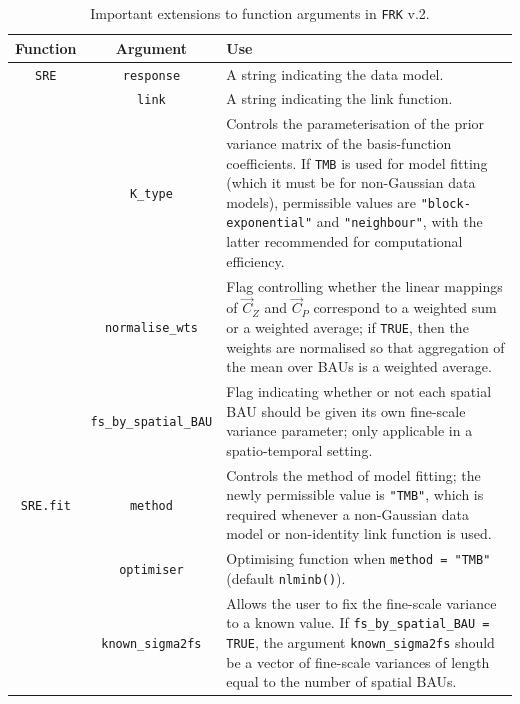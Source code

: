 \documentclass[12pt,a4paper]{article}
\begin{document}
\begin{table}%
    \centering
    \setlength{\tabcolsep}{2pt}
    \renewcommand{\arraystretch}{1.15}
    \caption{Important extensions to function arguments in \texttt{FRK} v.2.}
    \label{tab:new_arguments_in_functions}
    \begin{tabular}{ccp{11.5cm}}
    \hline
    \hline
    Function & Argument & Use\\
    \hline
    \texttt{SRE} & \texttt{response}  & A string indicating the data model. \\%
        & \texttt{link}      & A string indicating the link function.\\%
        & \texttt{K\_type}   & Controls the parameterisation of the prior variance matrix of the basis-function coefficients. If \texttt{TMB} is used for model fitting (which it must be for non-Gaussian data models), permissible values are \texttt{"block-exponential"} and \texttt{"neighbour"}, with the latter recommended for computational efficiency. \\%
        & \texttt{normalise\_wts} & Flag controlling whether the linear mappings of $\vec{C}_Z$ and $\vec{C}_P$ correspond to a weighted sum or a weighted average; if \texttt{TRUE}, then the weights are normalised so that aggregation of the mean over BAUs is a weighted average.\\
        & \texttt{fs\_by\_spatial\_BAU} & Flag indicating whether or not each spatial BAU should be given its own fine-scale variance parameter; only applicable in a spatio-temporal setting.\\
        \texttt{SRE.fit} & \texttt{method} & Controls the method of model fitting; the newly permissible value is \texttt{"TMB"}, which is required whenever a non-Gaussian data model or non-identity link function is used.\\%
        & \texttt{optimiser} & Optimising function when \texttt{method = "TMB"} (default \texttt{nlminb()}). \\
        & \texttt{known\_sigma2fs} & Allows the user to fix the fine-scale variance to a known value. 
        If \texttt{fs\_by\_spatial\_BAU = TRUE}, the argument \texttt{known\_sigma2fs} should be a vector of fine-scale variances of length equal to the number of spatial BAUs.\\

\end{tabular}
\end{table}
\end{document}
